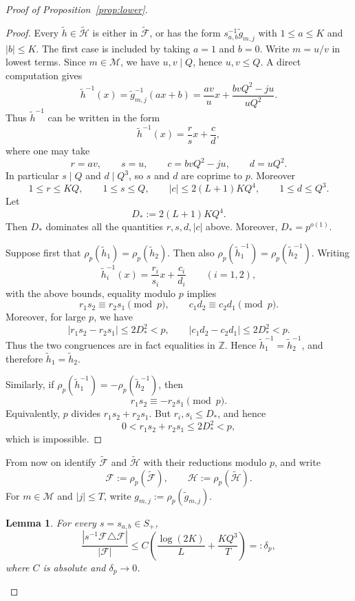 \documentclass[11pt,letterpaper,reqno]{amsart}
\newtheorem{lemma}[theorem]{Lemma}
\theoremstyle{definition}
\newcommand{\Z}{\mathbb Z}
\newcommand{\1}{\mathbf 1}
\begin{document}
\begin{proof}[Proof of Proposition~\ref{prop:lower}]
\begin{proof}
Every $\widetilde h\in\widetilde{\mathcal H}$ is either in
$\widetilde{\mathcal F}$, or has the form $s_{a,b}^{-1}\widetilde g_{m,j}$ with
$1\le a\le K$ and $|b|\le K$.  The first case is included by taking $a=1$ and
$b=0$.  Write $m=u/v$ in lowest terms.  Since $m\in\mathcal M$, we have
$u,v\mid Q$, hence $u,v\le Q$.  A direct computation gives
\[
    \widetilde h^{-1}(x)
    =\widetilde g_{m,j}^{-1}(ax+b)
    =\frac{av}{u}x+\frac{bvQ^2-ju}{uQ^2}.
\]
Thus $\widetilde h^{-1}$ can be written in the form
\[
        \widetilde h^{-1}(x)=\frac{r}{s}x+\frac{c}{d},
\]
where one may take
\[
        r=av,\qquad s=u,\qquad c=bvQ^2-ju,\qquad d=uQ^2 .
\]
In particular $s\mid Q$ and $d\mid Q^3$, so $s$ and $d$ are coprime to $p$.
Moreover
\[
    1\le r\le KQ,
    \qquad
    1\le s\le Q,
    \qquad
    |c|\le 2(L+1)KQ^4,    \qquad
    1\le d\le Q^3.
\]
Let
\[
        D_*:=2(L+1)KQ^4.
\]
Then $D_*$ dominates all the quantities $r,s,d,|c|$ above. 
Moreover, $D_*=p^{o(1)}$.

Suppose first that $\rho_p(\widetilde h_1)=\rho_p(\widetilde h_2)$.  Then also
$\rho_p(\widetilde h_1^{-1})=\rho_p(\widetilde h_2^{-1})$.  Writing
\[
    \widetilde h_i^{-1}(x)=\frac{r_i}{s_i}x+\frac{c_i}{d_i}
    \qquad (i=1,2),
\]
with the above bounds, equality modulo $p$ implies
\[
        r_1s_2\equiv r_2s_1\pmod p,
        \qquad
        c_1d_2\equiv c_2d_1\pmod p.
\]
Moreover, for large $p$, we have
\[
        |r_1s_2-r_2s_1|\le 2D_*^2<p,
        \qquad
        |c_1d_2-c_2d_1|\le 2D_*^2<p.
\]
Thus the two congruences are in fact equalities in $\Z$. Hence
$\widetilde h_1^{-1}=\widetilde h_2^{-1}$, and therefore
$\widetilde h_1=\widetilde h_2$.

Similarly, if
\(\rho_p(\widetilde h_1^{-1})=-\rho_p(\widetilde h_2^{-1})\), then
\[
        r_1s_2\equiv -r_2s_1 \pmod p .
\]
Equivalently, \(p\) divides \(r_1s_2+r_2s_1\).  But \(r_i,s_i\le D_*\), and hence
\[
        0<r_1s_2+r_2s_1\le 2D_*^2<p,
\]
which is impossible.
\end{proof}

From now on identify $\widetilde{\mathcal F}$ and $\widetilde{\mathcal H}$ with
their reductions modulo $p$, and write
\[
        \mathcal F:=\rho_p(\widetilde{\mathcal F}),
        \qquad
        \mathcal H:=\rho_p(\widetilde{\mathcal H}).
\]
For $m\in\mathcal M$ and $|j|\le T$, write
$g_{m,j}:=\rho_p(\widetilde g_{m,j})$.

\begin{lemma}\label{lem:Folner}
For every $s=s_{a,b}\in S_+$,
\[
        \frac{|s^{-1}\mathcal F\triangle\mathcal F|}{|\mathcal F|}
        \le C\left(\frac{\log(2K)}{L}+\frac{KQ^3}{T}\right)=: \delta_p,
\]
where $C$ is absolute and $\delta_p\to0$.
\end{lemma}


\end{proof}
\end{document}
